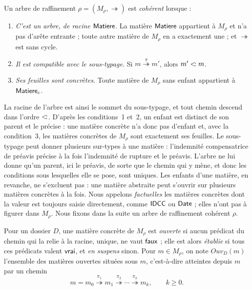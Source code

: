 \documentclass[review]{jflart}
\newcommand{\refby}[1]{\mathrel{\overset{#1}{\twoheadrightarrow}}}
\newcommand{\refine}{\mathrel{\twoheadrightarrow}}
\newcommand{\Ouv}{\ensuremath{\mathit{Ouv}}}
\begin{document}
\begin{defi}\label{def:coh-raff}
Un arbre de raffinement \(\rho=(M_\rho,\refine)\) est \emph{cohérent} lorsque :
\begin{enumerate}
\item \emph{C'est un arbre, de racine \(\mathsf{Matiere}\).} La matière \(\mathsf{Matiere}\)
  appartient à \(M_\rho\) et n'a pas d'arête entrante ; toute autre matière de
  \(M_\rho\) en a exactement une ; et \(\refine\) est sans cycle.
\item \emph{Il est compatible avec le sous-typage.} Si \(m\refby{\pi}m'\),
  alors \(m'\mathrel{<\!:} m\).
\item \emph{Ses feuilles sont concrètes.} Toute matière de \(M_\rho\) sans
  enfant appartient à \(\mathsf{Matiere}_c\).
\end{enumerate}
\end{defi}

La racine de l'arbre est ainsi le sommet du sous-typage, et tout chemin descend
dans l'ordre \(\mathrel{<\!:}\). D'après les conditions~1 et~2, un enfant est
distinct de son parent et le précise : une matière concrète n'a donc pas
d'enfant et, avec la condition~3, les matières concrètes de \(M_\rho\) sont
exactement ses feuilles. Le sous-typage peut donner plusieurs sur-types à une
matière : l'indemnité compensatrice de préavis précise à la fois l'indemnité de
rupture et le préavis. L'arbre ne lui donne qu'un parent, ici le préavis, de sorte que le chemin qui y mène,
et donc les conditions sous lesquelles elle se pose, sont uniques. Les enfants
d'une matière, en revanche, ne s'excluent pas : une matière abstraite peut
s'ouvrir sur plusieurs matières concrètes à la fois. Nous appelons
\emph{factuelles} les matières concrètes dont la valeur est toujours saisie
directement, comme \(\mathsf{IDCC}\) ou \(\mathsf{Date}\) ; elles n'ont pas à figurer dans
\(M_\rho\). Nous fixons
dans la suite un arbre de raffinement cohérent \(\rho\).

\begin{defi}\label{def:ouvertes}
Pour un dossier \(D\), une matière concrète de \(M_\rho\) est \emph{ouverte}
si aucun prédicat du chemin qui la relie à la racine, unique, ne vaut
\(\mathsf{faux}\) ; elle est alors \emph{établie} si tous ces prédicats valent
\(\mathsf{vrai}\), et \emph{en suspens} sinon. Pour \(m\in M_\rho\), on note
\(\Ouv_D(m)\) l'ensemble des matières ouvertes situées sous \(m\),
c'est-à-dire atteintes depuis \(m\) par un chemin
\[
 m=m_0\refby{\pi_1}m_1\refby{\pi_2}\cdots\refby{\pi_k}m_k,
 \qquad k\geq0.
\]
\end{defi}
\end{document}
